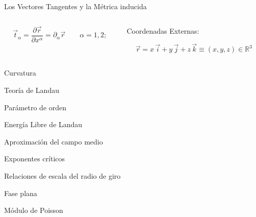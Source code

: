 \documentclass[xcolor=dvipsnames]{beamer}
\begin{document}
\begin{frame}{Los Vectores Tangentes y la Métrica inducida}
  \begin{columns}
    \begin{column}{5.8cm}
      \centering
      \begin{figure}[h]
        \resizebox{\columnwidth}{!}{}
      \end{figure}
      \begin{equation*}
        \vec{t}_{\alpha}=\frac{\partial \vec{r}}{\partial
          x^{\alpha}}=\partial_{\alpha}\vec{r} \qquad \alpha=1,2;
      \end{equation*}

    \end{column}
    \begin{column}{5.8cm}
      \centering
      Coordenadas Externas:
      \begin{figure}[h]
        \resizebox{\columnwidth}{!}{}
      \end{figure}
      \begin{equation*}
        \vec{r}=x\,\vec{i}+y\,\vec{j}+z\,\vec{k}\equiv (x,y,z)\in \mathbb{R}^3
      \end{equation*}
    \end{column}
  \end{columns}
\end{frame}

\begin{frame}{Curvatura}

\end{frame}

\begin{frame}{Teoría de Landau}
\end{frame}
\begin{frame}{Parámetro de orden}
\end{frame}
\begin{frame}{Energía Libre de Landau}
\end{frame}
\begin{frame}{Aproximación del campo medio}
\end{frame}
\begin{frame}{Exponentes críticos}
\end{frame}
\begin{frame}{Relaciones de escala del radio de giro}
\end{frame}
\begin{frame}{Fase plana}
\end{frame}
\begin{frame}{Módulo de Poisson}
\end{frame}
\end{document}
